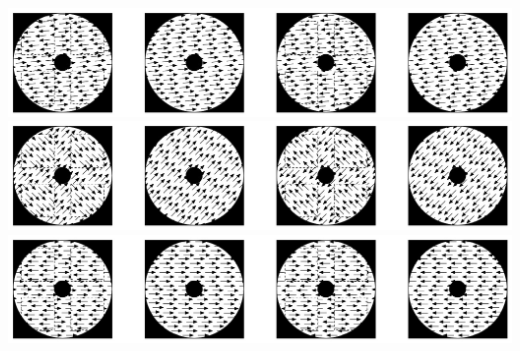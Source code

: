 \documentclass[landscape,final,paperwidth=72in,paperheight=42in,fontscale=0.285]{baposter}
\begin{document}
\begin{poster}
{          \begin{center}
            \includegraphics[scale=0.3]{img/mofo-child-tuning-dir5.jpg}
            \includegraphics[scale=0.3]{img/mofo-child-tuning-dir45.jpg}
            \includegraphics[scale=0.3]{img/mofo-child-tuning-dir180.jpg}
          \end{center}
      \vspace{3em}
    }

    {

}
\end{poster}
\end{document}
